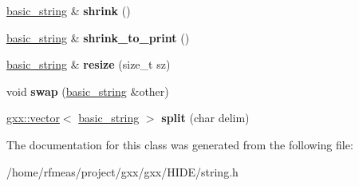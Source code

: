\begin{DoxyCompactItemize}
\item 
\hyperlink{classgxx_1_1basic__string}{basic\+\_\+string} \& {\bfseries shrink} ()\hypertarget{classgxx_1_1basic__string_a98a818d8de88dbc404693c5f4df92d22}{}\label{classgxx_1_1basic__string_a98a818d8de88dbc404693c5f4df92d22}

\item 
\hyperlink{classgxx_1_1basic__string}{basic\+\_\+string} \& {\bfseries shrink\+\_\+to\+\_\+print} ()\hypertarget{classgxx_1_1basic__string_adfcab85940409b2c9c3d988a71ff1729}{}\label{classgxx_1_1basic__string_adfcab85940409b2c9c3d988a71ff1729}

\item 
\hyperlink{classgxx_1_1basic__string}{basic\+\_\+string} \& {\bfseries resize} (size\+\_\+t sz)\hypertarget{classgxx_1_1basic__string_a6d132839b479dc93000d889a8bdf7fd5}{}\label{classgxx_1_1basic__string_a6d132839b479dc93000d889a8bdf7fd5}

\item 
void {\bfseries swap} (\hyperlink{classgxx_1_1basic__string}{basic\+\_\+string} \&other)\hypertarget{classgxx_1_1basic__string_a9e8e01330fcaddae66a91c6cf496a16e}{}\label{classgxx_1_1basic__string_a9e8e01330fcaddae66a91c6cf496a16e}

\item 
\hyperlink{classgxx_1_1vector}{gxx\+::vector}$<$ \hyperlink{classgxx_1_1basic__string}{basic\+\_\+string} $>$ {\bfseries split} (char delim)\hypertarget{classgxx_1_1basic__string_a21101d74e256539d46058ad8abdf71e9}{}\label{classgxx_1_1basic__string_a21101d74e256539d46058ad8abdf71e9}

\end{DoxyCompactItemize}


The documentation for this class was generated from the following file\+:\begin{DoxyCompactItemize}
\item 
/home/rfmeas/project/gxx/gxx/\+H\+I\+D\+E/string.\+h\end{DoxyCompactItemize}

